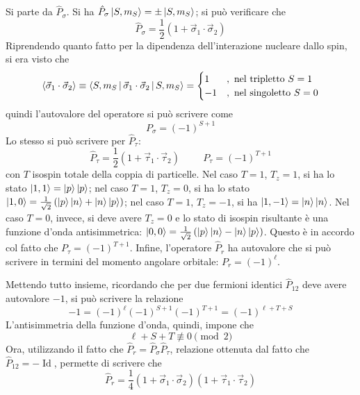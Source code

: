 \documentclass[11pt, a4paper]{scrartcl}
\theoremstyle{style}
\numberwithin{equation}{subsection}
\begin{document}
Si parte da $\hat{P}_\sigma $.
Si ha $\hat{P}_\sigma \ket{S,m_S} = \pm\ket{S,m_S} $; si pu\`o verificare che 
\[
\hat{P}_\sigma = \frac{1}{2} \left(1 + \vec{\sigma }_1 \cdot \vec{\sigma }_2\right) 
\] 
Riprendendo quanto fatto per la dipendenza dell'interazione nucleare dallo spin, si era visto che 
\[
\langle \vec{\sigma }_1 \cdot \vec{\sigma }_2  \rangle \equiv \Braket{S,m_S|\vec{\sigma }_1 \cdot \vec{\sigma }_2|S,m_S}  = \begin{cases}
	1&,\ \text{nel tripletto} \ S=1\\
	-1 &,\ \text{nel singoletto}\ S=0
\end{cases}
\] 
quindi l'autovalore del operatore si pu\`o scrivere come
\begin{equation}
	P_\sigma = (-1)^{S+1} 
\end{equation}
Lo stesso si pu\`o scrivere per $\hat{P}_\tau $:
\[
\hat{P}_\tau  = \frac{1}{2} \left(1 + \vec{\tau }_1 \cdot \vec{\tau }_{2} \right) \hspace{1cm} P_\tau  = (-1)^{T+1}
\] 
con $T$ isospin totale della coppia di particelle.
Nel caso $T=1$, $T_z=1$, si ha lo stato $\ket{1,1} = \ket{p} \ket{p} $; nel caso $T=1$, $T_z = 0$, si ha lo stato $\ket{1,0} = \frac{1}{\sqrt{2} } \left(\ket{p} \ket{n} + \ket{n} \ket{p} \right) $; nel caso $T=1$, $T_z = -1$, si ha $\ket{1 , -1}  = \ket{n} \ket{n} $.
Nel caso $T=0$, invece, si deve avere $T_z= 0$ e lo stato di isospin risultante \`e una funzione d'onda antisimmetrica: $\ket{0,0} = \frac{1}{\sqrt{2} } \left(\ket{p} \ket{n} - \ket{n} \ket{p} \right) $.
Questo \`e in accordo col fatto che $P_\tau  = (-1)^{T+1}$.
Infine, l'operatore $\hat{P}_r$ ha autovalore che si pu\`o scrivere in termini del momento angolare orbitale: $P_r = (-1)^{\ell}$.

Mettendo tutto insieme, ricordando che per due fermioni identici $\hat{P}_{12}$ deve avere autovalore $-1$, si pu\`o scrivere la relazione 
\begin{equation}
	-1 = (-1)^{\ell} (-1)^{S+1 } (-1)^{T+1}= (-1)^{\ell  + T +S}
\end{equation}
L'antisimmetria della funzione d'onda, quindi, impone che 
\[
\ell  + S + T \not\equiv 0 \pmod{2} 
\] 
Ora, utilizzando il fatto che $\hat{P}_r = \hat{P}_\sigma \hat{P}_\tau $, relazione ottenuta dal fatto che $\hat{P}_{12} = - \operatorname{Id} $, permette di scrivere che
\begin{equation}
\hat{P}_r = \frac{1}{4} \left(1 + \vec{\sigma }_1 \cdot \vec{\sigma }_2\right) \left(1 + \vec{\tau }_1 \cdot \vec{\tau }_2\right) 
\end{equation}
\end{document}
